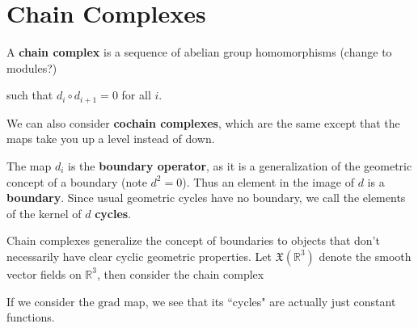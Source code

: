 \documentclass[10pt]{report}
\begin{document}


\section{Chain Complexes}

\begin{defn}[]
	A \textbf{chain complex} is a sequence of abelian group homomorphisms {\color{red}(change to modules?)}
\begin{center}
\end{center}
such that $d_i \circ d_{i+1}=0$ for all $i$.
\end{defn}

We can also consider \textbf{cochain complexes}, which are the same except that the maps take you up a level instead of down.
\begin{center}
\end{center}

The map $d_i$ is the \textbf{boundary operator}, as it is a generalization of the geometric concept of a boundary (note $d^2=0$). Thus an element in the image of $d$ is a \textbf{boundary}. Since usual geometric cycles have no boundary, we call the elements of the kernel of $d$ \textbf{cycles}.


\begin{ex}[]
Chain complexes generalize the concept of boundaries to objects that don't necessarily have clear cyclic geometric properties. Let $\mathfrak{X}(\mathbb{R}^3)$ denote the smooth vector fields on $\mathbb{R}^3$, then consider the chain complex
\begin{center}
\end{center}
If we consider the $\text{grad}$ map, we see that its ``cycles" are actually just constant functions.
\end{ex}
\end{document}
